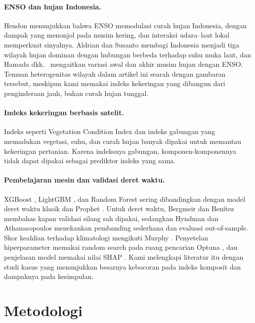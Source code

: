 \documentclass[11pt,twoside]{article}
\begin{document}
\paragraph{ENSO dan hujan Indonesia.} Hendon \cite{hendon2003indonesian} menunjukkan bahwa ENSO memodulasi curah hujan Indonesia, dengan dampak yang menonjol pada musim kering, dan interaksi udara--laut lokal memperkuat sinyalnya. Aldrian dan Susanto \cite{aldrian2003rainfall} membagi Indonesia menjadi tiga wilayah hujan dominan dengan hubungan berbeda terhadap suhu muka laut, dan Hamada dkk.\ \cite{hamada2002rainy} mengaitkan variasi awal dan akhir musim hujan dengan ENSO. Temuan heterogenitas wilayah dalam artikel ini searah dengan gambaran tersebut, meskipun kami memakai indeks kekeringan yang dibangun dari penginderaan jauh, bukan curah hujan tunggal.

\paragraph{Indeks kekeringan berbasis satelit.} Indeks seperti Vegetation Condition Index \cite{kogan1995vci} dan indeks gabungan yang memadukan vegetasi, suhu, dan curah hujan \cite{rhee2010sdci} banyak dipakai untuk memantau kekeringan pertanian. Karena indeksnya gabungan, komponen-komponennya tidak dapat dipakai sebagai prediktor indeks yang sama.

\paragraph{Pembelajaran mesin dan validasi deret waktu.} XGBoost \cite{chen2016xgboost}, LightGBM \cite{ke2017lightgbm}, dan Random Forest \cite{breiman2001rf} sering dibandingkan dengan model deret waktu klasik dan Prophet \cite{taylor2018prophet}. Untuk deret waktu, Bergmeir dan Ben\'itez \cite{bergmeir2012cv} membahas kapan validasi silang sah dipakai, sedangkan Hyndman dan Athanasopoulos \cite{hyndman2021fpp3} menekankan pembanding sederhana dan evaluasi out-of-sample. Skor keahlian terhadap klimatologi mengikuti Murphy \cite{murphy1988skill}. Penyetelan hiperparameter memakai random search pada ruang pencarian Optuna \cite{akiba2019optuna}, dan penjelasan model memakai nilai SHAP \cite{lundberg2017shap}. Kami melengkapi literatur itu dengan studi kasus yang menunjukkan besarnya kebocoran pada indeks komposit dan dampaknya pada kesimpulan.

\section{Metodologi}
\label{Sec:Method}
\end{document}
